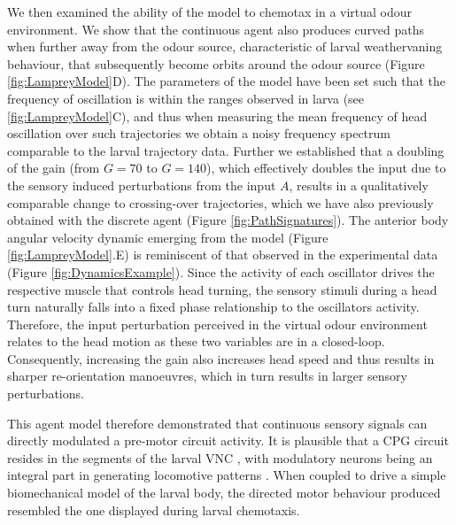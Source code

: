 \documentclass[11pt,a4paper]{article}
\newcommand{\todoBW}[1]{\todo[author=BW,color=orange, size=\tiny,inline]{1}}
\begin{document}
We then examined the ability of the model to chemotax in a virtual odour environment. We show that the continuous agent also produces curved paths when further away from the odour source, characteristic of larval weathervaning behaviour, that subsequently become orbits around the odour source (Figure \ref{fig:LampreyModel}D). The parameters of the model have been set such that the frequency of oscillation is within the ranges observed in larva (see \ref{fig:LampreyModel}C), and thus when measuring the mean frequency of head oscillation over such trajectories we obtain a noisy frequency spectrum comparable to the larval trajectory data. 
Further we established that a doubling of the gain (from $G=70$ to $G=140$), which effectively doubles the input due to the sensory induced perturbations from the input $A$, results in a qualitatively comparable change to crossing-over trajectories, which we have also previously obtained with the discrete agent (Figure \ref{fig:PathSignatures}). The anterior body angular velocity dynamic emerging from the model (Figure \ref{fig:LampreyModel}.E) is reminiscent of that observed in the experimental data (Figure \ref{fig:DynamicsExample}).
Since the activity of each oscillator drives the respective muscle that controls head turning, the sensory stimuli during a head turn naturally falls into a fixed phase relationship to the oscillators activity. Therefore, the input perturbation perceived in the virtual odour environment relates to the head motion as these two variables are in a closed-loop. 
Consequently, increasing the gain also increases head speed and thus results in sharper re-orientation manoeuvres, which in turn results in larger sensory perturbations.
 
\todoBW{Is following paragraph necessary?}
This agent model therefore demonstrated that continuous sensory signals can  directly modulated a pre-motor circuit activity. It is plausible that a CPG circuit resides in the segments of the larval VNC \citep{kohsaka2012development}, with modulatory neurons being an integral part in generating locomotive patterns \citep{suster2003targeted}. When coupled to drive a simple biomechanical model of the larval body, the directed motor behaviour produced resembled the one displayed during larval chemotaxis.
\end{document}
